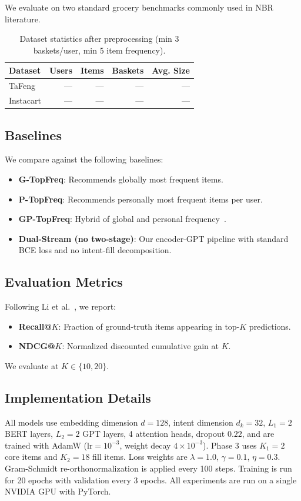 \documentclass[conference]{IEEEtran}
\begin{document}
We evaluate on two standard grocery benchmarks commonly used in NBR literature.

\begin{table}[h]
\centering
\caption{Dataset statistics after preprocessing (min 3 baskets/user, min 5 item frequency).}
\label{tab:datasets}
\begin{tabular}{lrrrr}
\toprule
\textbf{Dataset} & \textbf{Users} & \textbf{Items} & \textbf{Baskets} & \textbf{Avg. Size} \\
\midrule
TaFeng     & --- & --- & --- & --- \\
Instacart  & --- & --- & --- & --- \\
\bottomrule
\end{tabular}
\end{table}

\subsection{Baselines}
We compare against the following baselines:
\begin{itemize}
\item \textbf{G-TopFreq}: Recommends globally most frequent items.
\item \textbf{P-TopFreq}: Recommends personally most frequent items per user.
\item \textbf{GP-TopFreq}: Hybrid of global and personal frequency~\cite{li2023next}.
\item \textbf{Dual-Stream (no two-stage)}: Our encoder-GPT pipeline with standard BCE loss and no intent-fill decomposition.
\end{itemize}

\subsection{Evaluation Metrics}
Following Li et al.~\cite{li2023next}, we report:
\begin{itemize}
\item \textbf{Recall@$K$}: Fraction of ground-truth items appearing in top-$K$ predictions.
\item \textbf{NDCG@$K$}: Normalized discounted cumulative gain at $K$.
\end{itemize}
We evaluate at $K \in \{10, 20\}$.

\subsection{Implementation Details}
All models use embedding dimension $d = 128$, intent dimension $d_k = 32$, $L_1 = 2$ BERT layers, $L_2 = 2$ GPT layers, 4 attention heads, dropout $0.22$, and are trained with AdamW ($\text{lr}=10^{-3}$, weight decay $4 \times 10^{-3}$). Phase 3 uses $K_1 = 2$ core items and $K_2 = 18$ fill items. Loss weights are $\lambda = 1.0$, $\gamma = 0.1$, $\eta = 0.3$. Gram-Schmidt re-orthonormalization is applied every 100 steps. Training is run for 20 epochs with validation every 3 epochs. All experiments are run on a single NVIDIA GPU with PyTorch.
\end{document}
